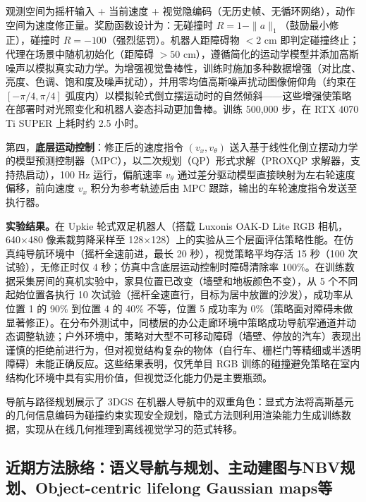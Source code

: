 观测空间为摇杆输入 + 当前速度 + 视觉隐编码（无历史帧、无循环网络），动作空间为速度修正量。奖励函数设计为：无碰撞时 $R = 1 - \|a\|_1$（鼓励最小修正），碰撞时 $R = -100$（强烈惩罚）。机器人距障碍物 $<2$ cm 即判定碰撞终止；代理在场景中随机初始化（距障碍 $>50$ cm），遵循简化的运动学模型并添加高斯噪声以模拟真实动力学。为增强视觉鲁棒性，训练时施加多种数据增强（对比度、亮度、色调、饱和度及噪声扰动），并用零均值高斯噪声扰动图像俯仰角（约束在 $[-\pi/4, \pi/4]$ 弧度内）以模拟轮式倒立摆运动时的自然倾斜——这些增强使策略在部署时对光照变化和机器人姿态抖动更加鲁棒。训练 500,000 步，在 RTX 4070 Ti SUPER 上耗时约 2.5 小时。

第四，\textbf{底层运动控制}：修正后的速度指令 $(v_x, v_\theta)$ 送入基于线性化倒立摆动力学的模型预测控制器（MPC），以二次规划（QP）形式求解（PROXQP 求解器，支持热启动），100 Hz 运行，偏航速率 $v_\theta$ 通过差分驱动模型直接映射为左右轮速度偏移，前向速度 $v_x$ 积分为参考轨迹后由 MPC 跟踪，输出的车轮速度指令发送至执行器。

\textbf{实验结果。}在 Upkie 轮式双足机器人（搭载 Luxonis OAK-D Lite RGB 相机，640$\times$480 像素裁剪降采样至 128$\times$128）上的实验从三个层面评估策略性能。在仿真纯导航环境中（摇杆全速前进，最长 20 秒），视觉策略平均存活 15 秒（100 次试验），无修正时仅 4 秒；仿真中含底层运动控制时障碍清除率 100\%。在训练数据采集房间的真机实验中，家具位置已改变（墙壁和地板颜色不变），从 5 个不同起始位置各执行 10 次试验（摇杆全速直行，目标为居中放置的沙发），成功率从位置 1 的 90\% 到位置 4 的 40\% 不等，位置 5 成功率为 0\%（策略面对障碍未做显著修正）。在分布外测试中，同楼层的办公走廊环境中策略成功导航窄通道并动态调整轨迹；户外环境中，策略对大型不可移动障碍（墙壁、停放的汽车）表现出谨慎的拒绝前进行为，但对视觉结构复杂的物体（自行车、栅栏门等精细或半透明障碍）未能正确反应。这些结果表明，仅凭单目 RGB 训练的碰撞避免策略在室内结构化环境中具有实用价值，但视觉泛化能力仍是主要瓶颈。

\begin{takeaway}
导航与路径规划展示了 3DGS 在机器人导航中的双重角色：显式方法将高斯基元的几何信息编码为碰撞约束实现安全规划，隐式方法则利用渲染能力生成训练数据，实现从在线几何推理到离线视觉学习的范式转移。
\end{takeaway}


\subsection{近期方法脉络：语义导航与规划、主动建图与NBV规划、Object-centric lifelong Gaussian maps等}

